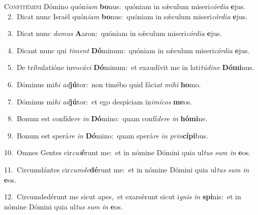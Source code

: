 \lettrine{\initial\textcolor{\initialcolor}{C}}{onfitémini} Dómino quón\-\textit{i}\-\textit{am} \textbf{bo}\-nus:~\star quóniam in sǽculum miseri\-\textit{cór}\-\textit{di}\textit{a} \textbf{e}\-jus.\\
{\numbfont\textcolor{\numbcolor}{~2.}}~Dicat nunc Israël quón\-\textit{i}\-\textit{am} \textbf{bo}\-nus:~\star quóniam in sǽculum miseri\-\textit{cór}\-\textit{di}\textit{a} \textbf{e}\-jus.\par
{\numbfont\textcolor{\numbcolor}{~3.}}~Dicat nunc \textit{do}\-\textit{mus} \textbf{A}\-aron:~\star quóniam in sǽculum miseri\-\textit{cór}\-\textit{di}\textit{a} \textbf{e}\-jus.\par
{\numbfont\textcolor{\numbcolor}{~4.}}~Dicant nunc qui \textit{ti}\-\textit{ment} \textbf{Dó}\-minum:~\star quóniam in sǽculum miseri\-\textit{cór}\-\textit{di}\textit{a} \textbf{e}\-jus.\par
{\numbfont\textcolor{\numbcolor}{~5.}}~De tribulatióne invo\-\textit{cá}\-\textit{vi} \textbf{Dó}\-minum:~\star et exaudívit me in lati\-\textit{tú}\-\textit{di}\textit{ne} \textbf{Dó}\-\textbf{mi}nus.\par
{\numbfont\textcolor{\numbcolor}{~6.}}~Dóminus mi\textit{hi} \textit{ad}\-\textbf{jú}tor:~\star non timébo quid fáci\textit{at} \textit{mi}\-\textit{hi} \textbf{ho}\-mo.\par
{\numbfont\textcolor{\numbcolor}{~7.}}~Dóminus mi\textit{hi} \textit{ad}\-\textbf{jú}tor:~\star et ego despíciam in\-\textit{i}\-\textit{mí}\textit{cos} \textbf{me}\-os.\par
{\numbfont\textcolor{\numbcolor}{~8.}}~Bonum est confíde\textit{re} \textit{in} \textbf{Dó}\-mino:~\star quam confí\-\textit{de}\-\textit{re} \textit{in} \textbf{hó}\-\textbf{mi}ne.\par
{\numbfont\textcolor{\numbcolor}{~9.}}~Bonum est sperá\textit{re} \textit{in} \textbf{Dó}\-mino:~\star quam sperá\textit{re} \textit{in} \textit{prin}\-\textbf{cí}\textbf{pi}bus.\par
{\numbfont\textcolor{\numbcolor}{10.}}~Omnes Gentes cir\-\textit{cu}\-\textit{i}\textbf{é}runt me:~\star et in nómine Dómini quia ul\textit{tus} \textit{sum} \textit{in} \textbf{e}\-os.\par
{\numbfont\textcolor{\numbcolor}{11.}}~Circumdántes cir\-\textit{cum}\-\textit{de}\textbf{dé}runt me:~\star et in nómine Dómini quia ul\textit{tus} \textit{sum} \textit{in} \textbf{e}\-os.\par
{\numbfont\textcolor{\numbcolor}{12.}}~Circumdedérunt me sicut apes,~\dagger et exarsérunt sicut i\textit{gnis} \textit{in} \textbf{spi}\-nis:~\star et in nómine Dómini quia ul\textit{tus} \textit{sum} \textit{in} \textbf{e}\-os.\par

